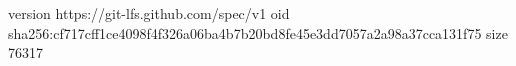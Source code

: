 version https://git-lfs.github.com/spec/v1
oid sha256:cf717cff1ce4098f4f326a06ba4b7b20bd8fe45e3dd7057a2a98a37cca131f75
size 76317

